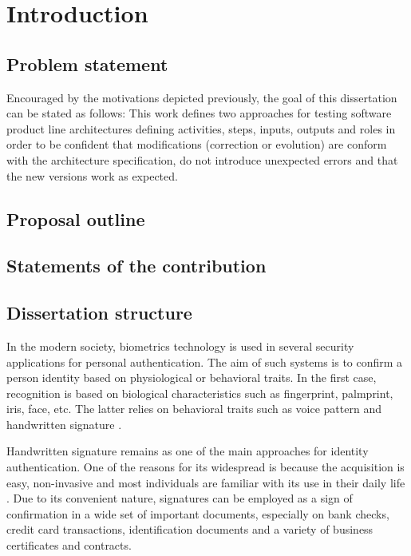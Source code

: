 
\chapter{Introduction}
\section{Problem statement}
Encouraged by the motivations depicted previously, the goal of this dissertation can be stated as follows:
This work defines two approaches for testing software product line architectures defining activities, steps, inputs, outputs and roles in order to be confident that modifications
(correction or evolution) are conform with the architecture specification, do not introduce unexpected errors and that the new versions work as expected.

\section{Proposal outline}

\section{Statements of the contribution}

\section{Dissertation structure}

In the modern society, biometrics technology is used in several security applications for personal authentication. The aim of such systems is to confirm a person identity based on physiological or behavioral traits. In the first case, recognition is based on biological characteristics such as fingerprint, palmprint, iris, face, etc. The latter relies on behavioral traits such as voice pattern and handwritten signature \cite{jain2004biometrics}.

Handwritten signature remains as one of the main approaches for identity authentication. One of the reasons for its widespread is because the acquisition is easy, non-invasive and most individuals are familiar with its use in their daily life \cite{impedovo2008state}. Due to its convenient nature, signatures can be employed as a sign of confirmation in a wide set of important documents, especially on bank checks, credit card transactions, identification documents and a variety of business certificates and contracts.

